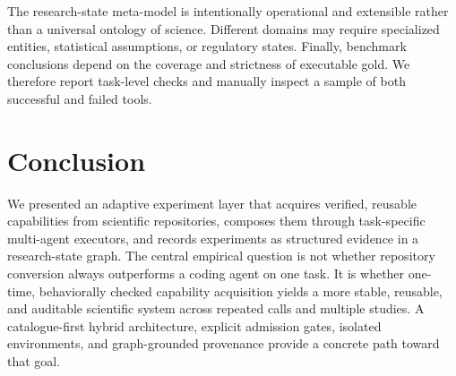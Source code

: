 \documentclass[letterpaper]{article} %
\begin{document}
The research-state meta-model is intentionally operational and extensible rather than a universal ontology of science. Different domains may require specialized entities, statistical assumptions, or regulatory states. Finally, benchmark conclusions depend on the coverage and strictness of executable gold. We therefore report task-level checks and manually inspect a sample of both successful and failed tools.

\section{Conclusion}

We presented an adaptive experiment layer that acquires verified, reusable capabilities from scientific repositories, composes them through task-specific multi-agent executors, and records experiments as structured evidence in a research-state graph. The central empirical question is not whether repository conversion always outperforms a coding agent on one task. It is whether one-time, behaviorally checked capability acquisition yields a more stable, reusable, and auditable scientific system across repeated calls and multiple studies. A catalogue-first hybrid architecture, explicit admission gates, isolated environments, and graph-grounded provenance provide a concrete path toward that goal.


\end{document}

